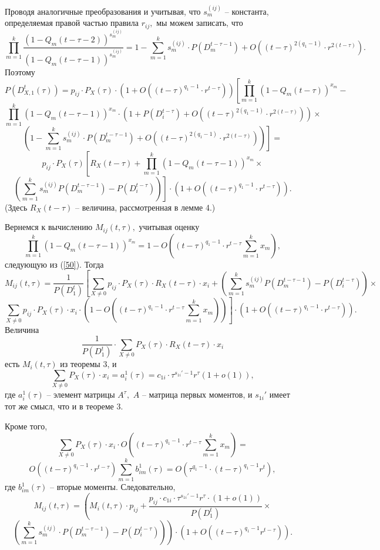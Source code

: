 \documentclass[12pt,russian]{article}
\begin{document}
{Проводя аналогичные преобразования и учитывая, что $s_m^{(ij)}$ -- константа,
определяемая правой частью правила $r_{ij},$ мы можем записать, что
$$
\prod_{m=1}^k \frac{(1-Q_m(t-\tau-2))^{s_m^{(ij)}}}
{(1-Q_m(t-\tau-1))^{s_m^{(ij)}}}=
1-\sum_{m=1}^k s_m^{(ij)}\cdot P\left(D_m^{t-\tau-1}\right)+
O\left((t-\tau)^{2(q_1-1)}\cdot r^{2(t-\tau)}\right).
$$
Поэтому
$$
P\left(D^t_{X,1}(\tau)\right)=
p_{ij} \cdot P_X(\tau) \cdot
\left(1+O\left((t-\tau)^{q_1-1}\cdot r^{t-\tau}\right)\right)
\left[\prod_{m=1}^k \left(1-Q_m(t-\tau)\right)^{x_m}- \right.
$$
$$
\prod_{m=1}^k \left(1-Q_m(t-\tau-1)\right)^{x_m} \cdot
\left(1+P(D_i^{t-\tau})+O((t-\tau)^{2(q_1-1)}\cdot r^{2(t-\tau)})\right) \times
$$
$$
\left.\left(1-\sum_{m=1}^k s_m^{(ij)}\cdot P\left(D_m^{t-\tau-1}\right)+
O\left((t-\tau)^{2(q_1-1)}\cdot r^{2(t-\tau)}\right)\right)\right]=
$$
$$
p_{ij} \cdot P_X(\tau) \left[ R_X(t-\tau) + 
 \prod_{m=1}^k \left(1-Q_m(t-\tau-1)\right)^{x_m} \times
\right.
$$
$$
\left.\left(\sum_{m=1}^k s_m^{(ij)}P(D_m^{t-\tau-1})-P(D_i^{t-\tau}) \right)\right]
\cdot
\left(1+O\left((t-\tau)^{q_1-1}\cdot r^{t-\tau}\right)\right).
$$
(Здесь $R_X(t-\tau)$ -- величина, рассмотренная в лемме 4.)

Вернемся к вычислению $M_{ij}(t,\tau),$
учитывая оценку $$
\prod_{m=1}^k \left(1-Q_m(t-\tau-1)\right)^{x_m}=
1- O\left((t-\tau)^{q_1-1}\cdot r^{t-\tau}\sum_{m=1}^k x_m\right),
$$
следующую из (\ref{50}).
Тогда
$$
M_{ij}(t,\tau)=
\frac{1}{P(D_1^t)} \left[\sum_{X \ne 0} p_{ij} \cdot P_X(\tau) \cdot R_X(t-\tau)\cdot x_i+ \right.
\left(\sum_{m=1}^k s_m^{(ij)} P\left(D_m^{t-\tau-1}\right)-
P\left(D_i^{t-\tau}\right)\right)\times
$$
$$
\left.\sum_{X \ne 0} p_{ij} \cdot P_X(\tau) \cdot x_i 
\cdot \left(1- O\left((t-\tau)^{q_1-1}\cdot r^{t-\tau}\sum_{m=1}^k x_m\right)\right)\right]\cdot
\left(1+O\left((t-\tau)^{q_1-1}\cdot r^{t-\tau}\right)\right).
$$
Величина
$$
\frac{1}{P(D_1^t)} \cdot
\sum_{X \ne 0} P_X(\tau) \cdot R_X(t-\tau)\cdot x_i
$$
есть $M_i(t,\tau)$ из теоремы 3, и
$$
\sum_{X \ne 0} P_X(\tau) \cdot x_i=
a_i^1(\tau)=c_{1i}\cdot \tau^{s_{1i}'-1}r^{\tau}(1+o(1)),
$$
где $a_i^1 (\tau)$ -- элемент матрицы $A^{\tau},$
$A$ -- матрица первых моментов, и 
$s_{1i}'$ имеет тот же смысл, что и в теореме 3.

Кроме того,
$$
\sum_{X \ne 0} P_X(\tau) \cdot x_i \cdot O\left((t-\tau)^{q_1-1}\cdot r^{t-\tau}\sum_{m=1}^k x_m\right)=
$$
$$
O\left((t-\tau)^{q_1-1}\cdot r^{t-\tau}\right)\sum_{m=1}^k b^1_{im}(\tau)=
O\left(\tau^{q_1-1} \cdot (t-\tau)^{q_1-1 }r^{t}\right),
$$
где $b^1_{im}(\tau)$ -- вторые моменты.
Следовательно,
$$
M_{ij}(t,\tau)= \left(M_i(t,\tau)\cdot p_{ij} +
\frac{p_{ij} \cdot c_{1i}\cdot \tau^{s_{1i}'-1}r^{\tau}\cdot (1+o(1)) }{P(D_1^t)} \times \right.
$$
$$
\left. \left(\sum_{m=1}^k s_m^{(ij)}\cdot
P(D_m^{t-\tau-1})- P(D_i^{t-\tau}) \right)\right)
\cdot \left(1+ O\left((t-\tau)^{q_1-1} r^{t-\tau}\right)\right).
$$

}
\end{document}
